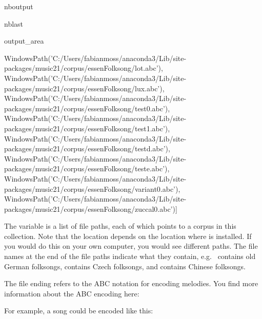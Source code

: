 \documentclass[letterpaper,10pt,english]{sphinxmanual}
\begin{document}
\begin{sphinxuseclass}{nboutput}
\begin{sphinxuseclass}{nblast}
{\begin{sphinxuseclass}{output_area}
\begin{sphinxuseclass}{}
\begin{sphinxVerbatim}[commandchars=\\\{\}]
 WindowsPath('C:/Users/fabianmoss/anaconda3/Lib/site-packages/music21/corpus/essenFolksong/lot.abc'),
 WindowsPath('C:/Users/fabianmoss/anaconda3/Lib/site-packages/music21/corpus/essenFolksong/lux.abc'),
 WindowsPath('C:/Users/fabianmoss/anaconda3/Lib/site-packages/music21/corpus/essenFolksong/test0.abc'),
 WindowsPath('C:/Users/fabianmoss/anaconda3/Lib/site-packages/music21/corpus/essenFolksong/test1.abc'),
 WindowsPath('C:/Users/fabianmoss/anaconda3/Lib/site-packages/music21/corpus/essenFolksong/testd.abc'),
 WindowsPath('C:/Users/fabianmoss/anaconda3/Lib/site-packages/music21/corpus/essenFolksong/teste.abc'),
 WindowsPath('C:/Users/fabianmoss/anaconda3/Lib/site-packages/music21/corpus/essenFolksong/variant0.abc'),
 WindowsPath('C:/Users/fabianmoss/anaconda3/Lib/site-packages/music21/corpus/essenFolksong/zuccal0.abc')]
\end{sphinxVerbatim}



\end{sphinxuseclass}
\end{sphinxuseclass}
}

\end{sphinxuseclass}
\end{sphinxuseclass}
\sphinxAtStartPar
The variable  is a list of file paths, each of which points to a corpus in this collection. Note that the location depends on the location where  is installed. If you would do this on your own computer, you would see different paths. The file names at the end of the file paths indicate what they contain, e.g.  contains old German folksongs,  contains Czech folksongs, and  contains Chinese folksongs.

\sphinxAtStartPar
The  file ending refers to the ABC notation for encoding melodies. You find more information about the ABC encoding here: 

\sphinxAtStartPar
For example, a song could be encoded like this:
\end{document}
